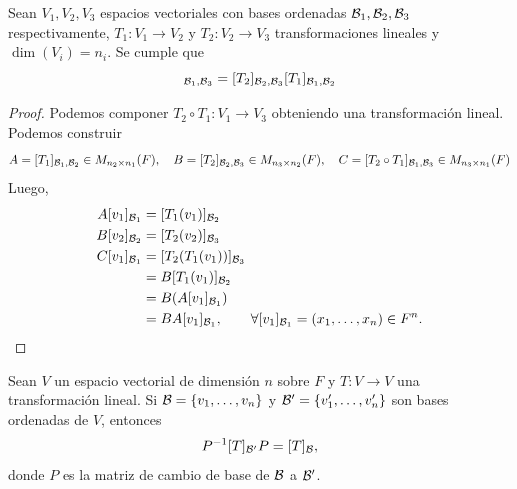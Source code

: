 \documentclass[12pt,a4paper]{book}
\newcommand{\llaves}[1]{\{#1\}}
\begin{document}
    \begin{proposicion}
    \label{prop:32}
        Sean $V_{1}, V_{2}, V_{3}$ espacios vectoriales con bases ordenadas $\mathcal{B}_{1}, \mathcal{B}_{2}, \mathcal{B}_{3}$ respectivamente, $T_{1}: V_{1} \to V_{2}$ y $T_{2}:V_{2} \to V_{3}$ transformaciones lineales y $\dim(V_{i}) = n_{i}$. Se cumple que
        \begin{equation*}
            [T_{2} \circ T_{1}]_{\BB_{1}, \BB_{3}} = [T_{2}]_{\BB_{2}, \BB_{3}}[T_{1}]_{\BB_{1}, \BB_{2}}
        \end{equation*}
    \end{proposicion}   

    \begin{proof}
        Podemos componer $T_{2} \circ T_{1}: V_{1} \to V_{3}$ obteniendo una transformación lineal. Podemos construir
        \begin{equation*}
            A = [T_{1}]_{\mathcal{B}_{1}, \mathcal{B}_{2}} \in M_{n_{2} \times n_{1}}(F), \quad B = [T_{2}]_{\mathcal{B}_{2}, \mathcal{B}_{3}} \in M_{n_{3} \times n_{2}}(F), \quad C = [T_{2} \circ T_{1}]_{\mathcal{B}_{1}, \mathcal{B}_{3}} \in M_{n_{3} \times n_{1}}(F)
        \end{equation*}
        Luego,
        \begin{align*}
            A[v_{1}]_{\mathcal{B}_{1}} & = [T_{1}(v_{1})]_{\mathcal{B}_{2}}\\
            B[v_{2}]_{\mathcal{B}_{2}} & = [T_{2}(v_{2})]_{\mathcal{B}_{3}}\\
            C[v_{1}]_{\mathcal{B}_{1}} & = [T_{2}(T_{1}(v_{1}))]_{\mathcal{B}_{3}}\\
            & = B[T_{1}(v_{1})]_{\mathcal{B}_{2}}\\
            & = B(A[v_{1}]_{\mathcal{B}_{1}})\\
            & = BA[v_{1}]_{\mathcal{B}_{1}}, \qquad \forall [v_{1}]_{\mathcal{B}_{1}} = (x_{1}, \dots, x_{n}) \in F^{n}.
        \end{align*}
    \end{proof}

    \begin{teorema}
    \label{teo:8}
        Sean $V$ un espacio vectorial de dimensión $n$ sobre $F$ y $T: V \to V$ una transformación lineal. Si $\BB = \llaves{v_{1}, \dots, v_{n}}$ y $\BB' = \llaves{v_{1}', \dots, v_{n}'}$ son bases ordenadas de $V$, entonces
        \begin{equation*}
            P^{-1}[T]_{\mathcal{B}'}P = [T]_{\mathcal{B}},
        \end{equation*}
        donde $P$ es la matriz de cambio de base de $\mathcal{B}$ a $\mathcal{B}'$.
    \end{teorema}
\end{document}

